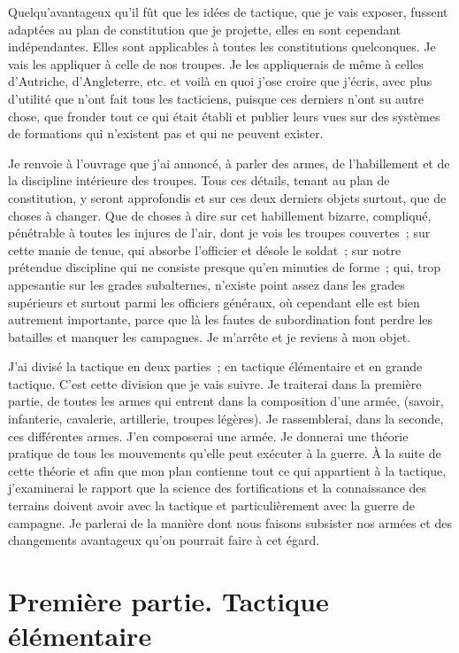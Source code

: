 \documentclass[french,twoside]{book} %
\begin{document}
Quelqu’avantageux qu’il fût que les idées de tactique, que je vais exposer, fussent adaptées au plan de constitution que je projette, elles en sont cependant indépendantes. Elles sont applicables à toutes les constitutions quelconques. Je vais les appliquer à celle de nos troupes. Je les appliquerais de même à celles d’Autriche, d’Angleterre, etc. et voilà en quoi j’ose croire que j’écris, avec plus d’utilité que n’ont fait tous les tacticiens, puisque ces derniers n’ont su autre chose, que fronder tout ce qui était établi et publier leurs vues sur des systèmes de formations qui n’existent pas et qui ne peuvent exister.\par
Je renvoie à l’ouvrage que j’ai annoncé, à parler des armes, de l’habillement et de la discipline intérieure des troupes. Tous ces détails, tenant au plan de constitution, y seront approfondis et sur ces deux derniers objets surtout, que de choses à changer. Que de choses à dire sur cet habillement bizarre, compliqué, pénétrable à toutes les injures de l’air, dont je vois les troupes couvertes ; sur cette manie de tenue, qui absorbe l’officier et désole le soldat ; sur notre prétendue discipline qui ne consiste presque qu’en minuties de forme ; qui, trop appesantie sur les grades subalternes, n’existe point assez dans les grades supérieurs et surtout parmi les officiers généraux, où cependant elle est bien autrement importante, parce que là les fautes de subordination font perdre les batailles et manquer les campagnes. Je m’arrête et je reviens à mon objet.\par
J’ai divisé la tactique en deux parties ; en tactique élémentaire et en grande tactique. C’est cette division que je vais suivre. Je traiterai dans la première partie, de toutes les armes qui entrent dans la composition d’une armée, (savoir, infanterie, cavalerie, artillerie, troupes légères). Je rassemblerai, dans la seconde, ces différentes armes. J’en composerai une armée. Je donnerai une théorie pratique de tous les mouvements qu’elle peut exécuter à la guerre. À la suite de cette théorie et afin que mon plan contienne tout ce qui appartient à la tactique, j’examinerai le rapport que la science des fortifications et la connaissance des terrains doivent avoir avec la tactique et particulièrement avec la guerre de campagne. Je parlerai de la manière dont nous faisons subsister nos armées et des changements avantageux qu’on pourrait faire à cet égard.
\section[{Première partie. Tactique élémentaire}]{Première partie. Tactique élémentaire}\renewcommand{\leftmark}{Première partie. Tactique élémentaire}
\end{document}
